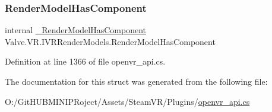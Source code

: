 \subsubsection{\texorpdfstring{RenderModelHasComponent}{RenderModelHasComponent}}
{\footnotesize\ttfamily internal \mbox{\hyperlink{struct_valve_1_1_v_r_1_1_i_v_r_render_models_ae4724e8f8a0a8d43df490e731a70307c}{\+\_\+\+Render\+Model\+Has\+Component}} Valve.\+V\+R.\+I\+V\+R\+Render\+Models.\+Render\+Model\+Has\+Component}



Definition at line 1366 of file openvr\+\_\+api.\+cs.



The documentation for this struct was generated from the following file\+:\begin{DoxyCompactItemize}
\item 
O\+:/\+Git\+H\+U\+B\+M\+I\+N\+I\+P\+Roject/\+Assets/\+Steam\+V\+R/\+Plugins/\mbox{\hyperlink{openvr__api_8cs}{openvr\+\_\+api.\+cs}}\end{DoxyCompactItemize}
